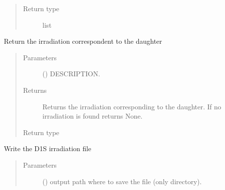 \documentclass[letterpaper,10pt,english]{sphinxmanual}
\begin{document}
\begin{fulllineitems}
\begin{fulllineitems}
\begin{quote}
\begin{description}
\item[{Return type}] \leavevmode
list

\end{description}\end{quote}

\end{fulllineitems}


\begin{fulllineitems}
\label{\detokenize{api/inputgeneration:parsersD1S.IrradiationFile.get_irrad}}
Return the irradiation correspondent to the daughter
\begin{quote}\begin{description}
\item[{Parameters}] \leavevmode
{} () \textendash{} DESCRIPTION.

\item[{Returns}] \leavevmode
Returns the irradiation corresponding to the daughter.
If no irradiation is found returns None.

\item[{Return type}] \leavevmode
{\hyperref[\detokenize{api/inputgeneration:parsersD1S.Irradiation}]{}}

\end{description}\end{quote}

\end{fulllineitems}


\begin{fulllineitems}
\label{\detokenize{api/inputgeneration:parsersD1S.IrradiationFile.write}}
Write the D1S irradiation file
\begin{quote}\begin{description}
\item[{Parameters}] \leavevmode
{} () \textendash{} output path where to save the file (only directory).


\end{description}
\end{quote}
\end{fulllineitems}
\end{fulllineitems}
\end{document}
